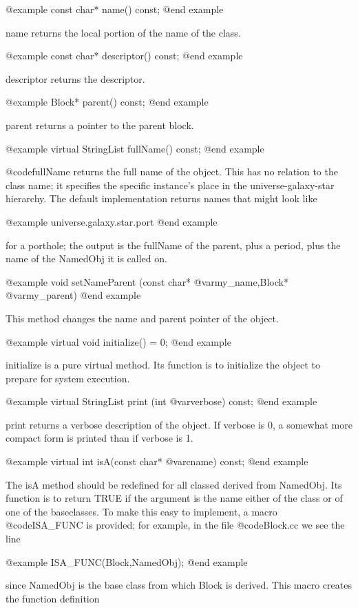 @example
const char* name() const;
@end example

name returns the local portion of the name of the class.

@example
const char* descriptor() const;
@end example

descriptor returns the descriptor.

@example
Block* parent() const;
@end example

parent returns a pointer to the parent block.

@example
virtual StringList fullName() const;
@end example

@code{fullName} returns the full name of the object.  This has no
relation to the class name; it specifies the specific instance's place
in the universe-galaxy-star hierarchy.  The default
implementation returns names that might look like

@example
universe.galaxy.star.port
@end example

for a porthole; the output is the fullName of the parent, plus a period,
plus the name of the NamedObj it is called on.

@example
void setNameParent (const char* @var{my_name},Block* @var{my_parent})
@end example

This method changes the name and parent pointer of the object.

@example
virtual void initialize() = 0;
@end example

initialize is a pure virtual method.  Its function is to initialize the
object to prepare for system execution.

@example
virtual StringList print (int @var{verbose}) const;
@end example

print returns a verbose description of the object.  If verbose is 0, a
somewhat more compact form is printed than if verbose is 1.

@example
virtual int isA(const char* @var{cname}) const;
@end example

The isA method should be redefined for all classed derived from
NamedObj.  Its function is to return TRUE if the argument is the name
either of the class or of one of the baseclasses.  To make this easy to
implement, a macro @code{ISA_FUNC} is provided; for example, in the
file @code{Block.cc} we see the line

@example
ISA_FUNC(Block,NamedObj);
@end example

since NamedObj is the base class from which Block is derived.  This
macro creates the function definition

